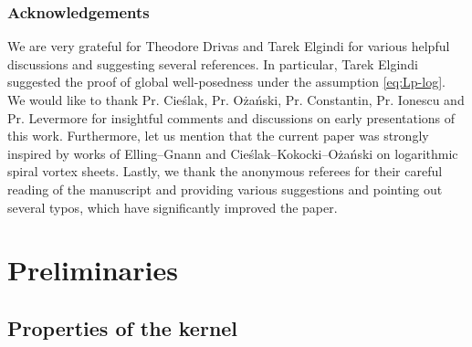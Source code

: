 \documentclass[10pt]{amsart}
\theoremstyle{plain}
\theoremstyle{definition}
\begin{document}
\subsubsection*{Acknowledgements}
We are very grateful for Theodore Drivas and Tarek Elgindi for various helpful discussions and suggesting several references. In particular, Tarek Elgindi suggested the proof of global well-posedness under the assumption \eqref{eq:Lp-log}. We would like to thank Pr. Cie{\'s}lak, Pr. O{\.z}a{\'n}ski, Pr. Constantin, Pr. Ionescu and Pr. Levermore for insightful comments and discussions on early presentations of this work. Furthermore, let us mention that the current paper was strongly inspired by works of Elling--Gnann and Cie{\'s}lak--Kokocki--O{\.z}a{\'n}ski on logarithmic spiral vortex sheets. Lastly, we thank the anonymous referees for their careful reading of the manuscript and providing various suggestions and pointing out several typos, which have significantly improved the paper.

\section{Preliminaries}\label{sec:prelim}

\subsection{Properties of the kernel}\label{subsec:elliptic}
\end{document}

